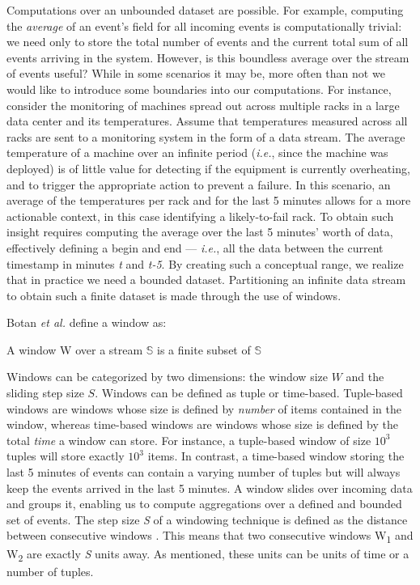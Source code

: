 Computations over an unbounded dataset are possible. For example, computing the \textit{average} of an event's field for all incoming events is computationally trivial: we need only to store the total number of events and the current total sum of all events arriving in the system. However, is this boundless average over the stream of events useful? While in some scenarios it may be, more often than not we would like to introduce some boundaries into our computations. For instance, consider the monitoring of machines spread out across multiple racks in a large data center and its temperatures. Assume that temperatures measured across all racks are sent to a monitoring system in the form of a data stream. The average temperature of a machine over an infinite period (\textit{i.e.}, since the machine was deployed) is of little value for detecting if the equipment is currently overheating, and to trigger the appropriate action to prevent a failure. In this scenario, an average of the temperatures per rack and for the last 5 minutes allows for a more actionable context, in this case identifying a likely-to-fail rack. To obtain such insight requires computing the average over the last 5 minutes' worth of data, effectively defining a begin and end --- \textit{i.e.}, all the data between the current timestamp in minutes \textit{t} and \textit{t-5}. By creating such a conceptual range, we realize that in practice we need a bounded dataset. Partitioning an infinite data stream to obtain such a finite dataset is made through the use of windows.

Botan \emph{et al.} \cite{Botan-SECRET} define a window as:
\begin{definition}
A window W over a stream $\mathbb{S}$ is a finite subset of $\mathbb{S}$
\end{definition}
Windows can be categorized by two dimensions: the window size $W$ and the sliding step size $S$. Windows can be defined as tuple or time-based. Tuple-based windows are windows whose size is defined by \emph{number} of items contained in the window, whereas time-based windows are windows whose size is defined by the total \emph{time} a window can store. For instance, a tuple-based window of size $10^3$ tuples will store exactly $10^3$ items. In contrast, a time-based window storing the last 5 minutes of events can contain a varying number of tuples but will always keep the events arrived in the last 5 minutes. A window slides over incoming data and groups it, enabling us to compute aggregations over a defined and bounded set of events. The step size \textit{S} of a windowing technique is defined as the distance between consecutive windows \cite{Botan-SECRET}. This means that two consecutive windows W\textsubscript{1} and W\textsubscript{2} are exactly \textit{S} units away. As mentioned, these units can be units of time or a number of tuples.

